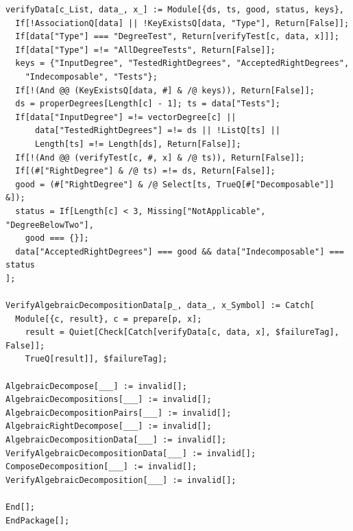 \documentclass[11pt,a4paper]{article}
\numberwithin{equation}{section}
\theoremstyle{definition}
\theoremstyle{remark}
\begin{document}
\begin{lstlisting}
verifyData[c_List, data_, x_] := Module[{ds, ts, good, status, keys},
  If[!AssociationQ[data] || !KeyExistsQ[data, "Type"], Return[False]];
  If[data["Type"] === "DegreeTest", Return[verifyTest[c, data, x]]];
  If[data["Type"] =!= "AllDegreeTests", Return[False]];
  keys = {"InputDegree", "TestedRightDegrees", "AcceptedRightDegrees",
    "Indecomposable", "Tests"};
  If[!(And @@ (KeyExistsQ[data, #] & /@ keys)), Return[False]];
  ds = properDegrees[Length[c] - 1]; ts = data["Tests"];
  If[data["InputDegree"] =!= vectorDegree[c] ||
      data["TestedRightDegrees"] =!= ds || !ListQ[ts] ||
      Length[ts] =!= Length[ds], Return[False]];
  If[!(And @@ (verifyTest[c, #, x] & /@ ts)), Return[False]];
  If[(#["RightDegree"] & /@ ts) =!= ds, Return[False]];
  good = (#["RightDegree"] & /@ Select[ts, TrueQ[#["Decomposable"]] &]);
  status = If[Length[c] < 3, Missing["NotApplicable", "DegreeBelowTwo"],
    good === {}];
  data["AcceptedRightDegrees"] === good && data["Indecomposable"] === status
];

VerifyAlgebraicDecompositionData[p_, data_, x_Symbol] := Catch[
  Module[{c, result}, c = prepare[p, x];
    result = Quiet[Check[Catch[verifyData[c, data, x], $failureTag], False]];
    TrueQ[result]], $failureTag];

AlgebraicDecompose[___] := invalid[];
AlgebraicDecompositions[___] := invalid[];
AlgebraicDecompositionPairs[___] := invalid[];
AlgebraicRightDecompose[___] := invalid[];
AlgebraicDecompositionData[___] := invalid[];
VerifyAlgebraicDecompositionData[___] := invalid[];
ComposeDecomposition[___] := invalid[];
VerifyAlgebraicDecomposition[___] := invalid[];

End[];
EndPackage[];

\end{lstlisting}
\end{document}
